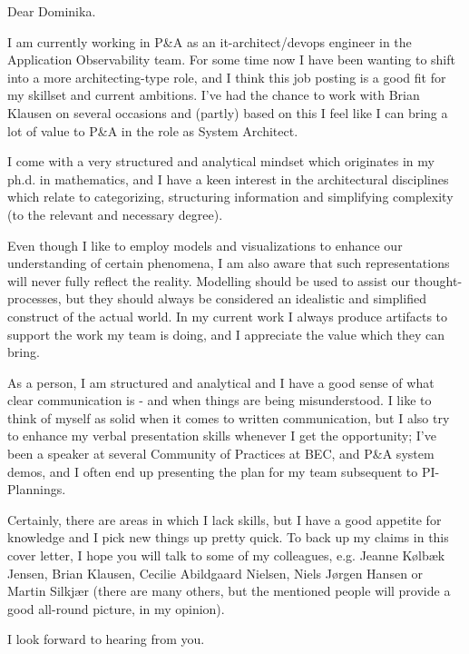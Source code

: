 \documentclass[11pt, a4paper]{awesome-cv} %
\begin{document}
\makecvheader %

\makelettertitle %


\begin{cvletter}
Dear Dominika.

I am currently working in P&A as an it-architect/devops engineer in the Application Observability team. For some time now I have been wanting to shift into a more architecting-type role, and I think this job posting is a good fit for my skillset and current ambitions. I've had the chance to work with Brian Klausen on several occasions and (partly) based on this I feel like I can bring a lot of value to P\&A in the role as System Architect.

I come with a very structured and analytical mindset which originates in my ph.d. in mathematics, and I have a keen interest in the architectural disciplines which relate to categorizing, structuring information and simplifying complexity (to the relevant and necessary degree).

Even though I like to employ models and visualizations to enhance our understanding of certain phenomena, I am also aware that such representations will never fully reflect the reality. Modelling should be used to assist our thought-processes, but they should always be considered an idealistic and simplified construct of the actual world. In my current work I always produce artifacts to support the work my team is doing, and I appreciate the value which they can bring.

As a person, I am structured and analytical and I have a good sense of what clear communication is - and when things are being misunderstood. I like to think of myself as solid when it comes to written communication, but I also try to enhance my verbal presentation skills whenever I get the opportunity; I've been a speaker at several Community of Practices at BEC, and P\&A system demos, and I often end up presenting the plan for my team subsequent to PI-Plannings.

Certainly, there are areas in which I lack skills, but I have a good appetite for knowledge and I pick new things up pretty quick. To back up my claims in this cover letter, I hope you will talk to some of my colleagues, e.g. Jeanne Kølbæk Jensen, Brian Klausen, Cecilie Abildgaard Nielsen, Niels Jørgen Hansen or Martin Silkjær (there are many others, but the mentioned people will provide a good all-round picture, in my opinion).

I look forward to hearing from you.
\end{cvletter}


\makeletterclosing %
\end{document}

